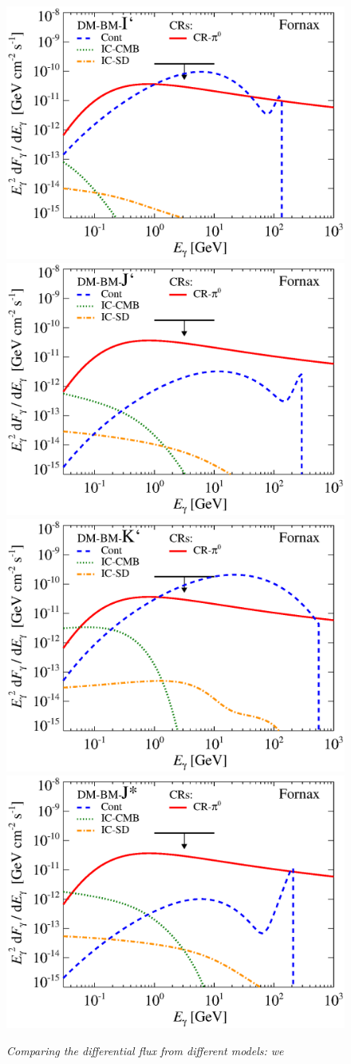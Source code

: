 \documentclass[10pt,aps,pra,reprint,amsmath,amsfonts,amssymb,showpacs,nofootinbib,floatfix]{revtex4-1}
\begin{document}
\begin{figure}
\begin{minipage}{2.0\columnwidth}
 \includegraphics[width=0.49\columnwidth]{figures/flux.BMcompI.v11.0.1deg.1.6T.SubMass.IR2.noMW.woGal.eps}
\includegraphics[width=0.49\columnwidth]{figures/flux.BMcompJ.v11.0.1deg.1.6T.SubMass.IR2.noMW.woGal.eps}
\includegraphics[width=0.49\columnwidth]{figures/flux.BMcompK.v11.0.1deg.1.6T.SubMass.IR2.noMW.woGal.eps}
\includegraphics[width=0.49\columnwidth]{figures/flux.BMcompJs.v11.0.1deg.1.6T.SubMass.IR2.noMW.woGal.eps}
\caption{\it Comparing the differential flux from different models: we
}
\end{minipage}
\end{figure}
\end{document}
